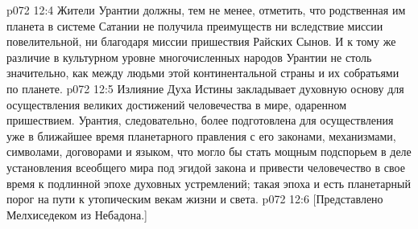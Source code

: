 \vs p072 12:4 \pc Жители Урантии должны, тем не менее, отметить, что родственная им планета в системе Сатании не получила преимуществ ни вследствие миссии повелительной, ни благодаря миссии пришествия Райских Сынов. И к тому же различие в культурном уровне многочисленных народов Урантии не столь значительно, как между людьми этой континентальной страны и их собратьями по планете.
\vs p072 12:5 Излияние Духа Истины закладывает духовную основу для осуществления великих достижений человечества в мире, одаренном пришествием. Урантия, следовательно, более подготовлена для осуществления уже в ближайшее время планетарного правления с его законами, механизмами, символами, договорами и языком, что могло бы стать мощным подспорьем в деле установления всеобщего мира под эгидой закона и привести человечество в свое время к подлинной эпохе духовных устремлений; такая эпоха и есть планетарный порог на пути к утопическим векам жизни и света.
\vsetoff
\vs p072 12:6 [Представлено Мелхиседеком из Небадона.]
